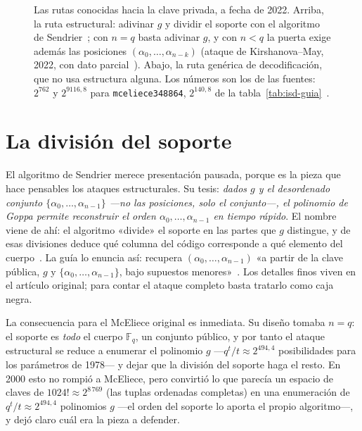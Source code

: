 \documentclass[11pt,a4paper,oneside]{report}
\newcommand{\GF}[1]{\mathbb{F}_{#1}}
\begin{document}
\begin{figure}[htbp]
\caption{Las rutas conocidas hacia la clave privada, a fecha de 2022.
Arriba, la ruta estructural: adivinar $g$ y dividir el soporte con el
algoritmo de Sendrier~\cite{sendrier2000}; con $n=q$ basta adivinar
$g$, y con $n<q$ la puerta exige además las posiciones
$(\alpha_0,\dots,\alpha_{n-k})$ (ataque de Kirshanova--May, 2022, con
dato parcial~\cite{kirshanova2022}). Abajo, la ruta genérica de
decodificación, que no usa estructura alguna. Los números son los de
las fuentes: $2^{762}$ y $2^{9116{,}8}$ para \texttt{mceliece348864},
$2^{140{,}8}$ de la tabla~\ref{tab:isd-guia}~\cite{cmsecurity}.}
\label{fig:est-rutas}
\end{figure}

\section{La división del soporte}\label{sec:est-support}

El algoritmo de Sendrier merece presentación pausada, porque es la
pieza que hace pensables los ataques estructurales. Su tesis:
\emph{dados $g$ y el desordenado conjunto $\{\alpha_0,\dots,\alpha_{n-1}\}$
---no las posiciones, solo el conjunto---, el polinomio de Goppa
permite reconstruir el orden $\alpha_0,\dots,\alpha_{n-1}$ en tiempo
rápido}. El nombre viene de ahí: el algoritmo «divide» el soporte en
las partes que $g$ distingue, y de esas divisiones deduce qué
columna del código corresponde a qué elemento del
cuerpo~\cite{sendrier2000}. La guía lo enuncia así: recupera
$(\alpha_0,\dots,\alpha_{n-1})$ «a partir de la clave pública, $g$
y $\{\alpha_0,\dots,\alpha_{n-1}\}$, bajo supuestos
menores»~\cite{cmsecurity}. Los detalles finos viven en el artículo
original; para contar el ataque completo basta tratarlo como caja
negra.

La consecuencia para el McEliece original es inmediata. Su diseño
tomaba $n=q$: el soporte es \emph{todo} el cuerpo $\GF{q}$, un
conjunto público, y por tanto el ataque estructural se reduce a
enumerar el polinomio $g$ ---$q^t/t\approx 2^{494{,}4}$ posibilidades
para los parámetros de 1978--- y dejar que la división del soporte
haga el resto. En 2000 esto no rompió a McEliece, pero convirtió lo
que parecía un espacio de claves de $1024!\approx 2^{8\,769}$ (las
tuplas ordenadas completas) en una enumeración de $q^{t}/t\approx
2^{494{,}4}$ polinomios $g$ ---el orden del soporte lo aporta el
propio algoritmo---, y dejó claro cuál era la pieza a defender.
\end{document}
